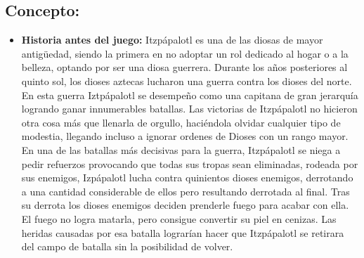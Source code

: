 \subsection{Concepto:}
\begin{itemize}
	\item \textbf{Historia antes del juego:}
	Itzpápalotl es una de las diosas de mayor antigüedad, siendo la primera en no adoptar un rol dedicado al hogar o a la belleza, optando por ser una diosa guerrera.
	Durante los años posteriores al quinto sol, los dioses aztecas lucharon una guerra contra los dioses del norte. En esta guerra Iztpápalotl se desempeño como una capitana de gran jerarquía logrando ganar innumerables batallas. Las victorias de Itzpápalotl no hicieron otra cosa más que llenarla de orgullo, haciéndola olvidar cualquier tipo de modestia, llegando incluso a ignorar ordenes de Dioses con un rango mayor. En una de las batallas más decisivas para la guerra, Itzpápalotl se niega a pedir refuerzos provocando que todas sus tropas sean eliminadas, rodeada por sus enemigos, Izpápalotl lucha contra quinientos dioses enemigos, derrotando a una cantidad considerable de ellos pero resultando derrotada al final. Tras su derrota los dioses enemigos deciden prenderle fuego para acabar con ella. El fuego no logra matarla, pero consigue convertir su piel en cenizas. Las heridas causadas por esa batalla lograrían hacer que Itzpápalotl se retirara del campo de batalla sin la posibilidad de volver.
	

\end{itemize}
